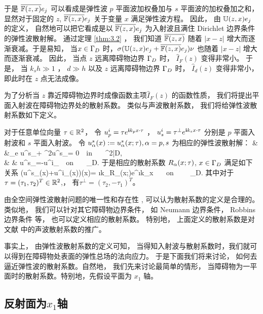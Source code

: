 {于是 $\overline{\mathbb{F}(z,x)}e_j$ 可以看成是弹性波 $p$ 平面波加权叠加与 $s$ 平面波的加权叠加之和， 显然对于固定的 $z$, $\overline{\mathbb{F}(z,x)}e_j$ 关于变量 $x$ 满足弹性波方程。 因此， 由 $\mathbb{U}(z,x)e_j$ 的定义， 自然地可以把它看成是以 $\overline{\mathbb{F}(z,x)}e_j$ 为入射波且满住 Dirichlet 边界条件的弹性波散射解。 通过定理 \ref{thm:3.2} ， 我们知道 $\overline{\mathbb{F}(z,x)}$ 随着 $|x-z|$ 增大而逐渐衰减。于是易知， 当$x\in \Gamma_D$ 时，$\sigma(\mathbb{U}(z,x)e_j+\overline{\mathbb{F}(z,x)}e_j)\nu$ 也随着 $|x-z|$ 增大而逐渐衰减。 因此， 当点 $z$ 远离障碍物边界 $\Gamma_D$ 时， $\hat{I}_F(z)$ 变得非常小。 于是， 当 $k_s h \gg 1$ ， $d\gg h$ 以及 $z$ 远离障碍物边界 $\Gamma_D$ 时， $\hat{I}_d(z)$ 变得非常小， 即此时在 $z$ 点无法成像。

为了分析当 $z$ 靠近障碍物边界时成像函数主项$\hat{I}_F(z)$ 的函数性质， 我们将提出平面入射波在障碍物边界处的散射系数。 类似与声波散射系数， 我们将给弹性波散射系数如下定义。

\begin{definition}\label{scarr_con}
	对于任意单位向量 $\tau\in \mathbb{R}^2$， 令 $u^i_p =\tau e^{\mathbf{i} k_p x\cdot \tau}$ ，  $u^i_s= \tau^\perp e^{\mathbf{i} k_s x\cdot \tau}$ 分别是 $p$ 平面入射波和 $s$ 平面入射波。   令 $u^s_\alpha (x) := u^s_\alpha(x;\tau), \alpha=p,s$ 为相应的弹性波散射解：
	\be\label{sc1}
	& &\De_e u^s_\alpha + \om^2u^s_\alpha = 0\ \ \mbox{in }   \ \ \R^2\bks\bar{D}, \ \ \ \  \\
	& & u^s_\alpha =-u^i_\alpha \ \ \mbox{on }  \ \ \Ga_D.
	\ee
	于是相应的散射系数 $R_\alpha(x;\tau)$, $x\in\Gamma_D$ 满足如下关系
	\ben
	\sigma(u^s_\alpha(x)+u^i_\alpha(x))\nu(x)= \i k_\alpha R_\alpha(x;\tau)e^{\i k_\alpha x\cdot \tau}  \ \ \ \mbox{on } \ \ \  \Ga_D.
	\een
	其中对于 $\tau=(\tau_1,\tau_2)^T\in\mathbb{R}^2$,， 有$\tau^\perp=(\tau_2,-\tau_1)^T$。
\end{definition}
\begin{remark}
	由全空间弹性波散射问题的唯一性和存在性 \cite{cxz2016,ku63}, 可以认为散射系数的定义是合理的。 类似地， 我们可以针对其它障碍物边界条件， 如 Neumann 边界条件， Robbins 边界条件 等， 也可以定义相应的散射系数。 特别地， 上面定义的散射系数是对文献\cite{RTMhalf_aco} 中的声波散射系数的推广。
\end{remark}

事实上， 由弹性波散射系数的定义可知， 当得知入射波与散射系数时，我们就可以得到在障碍物处表面的弹性总场的法向应力。 于是下面我们将来讨论， 如何去逼近弹性波的散射系数。自然地， 我们先来讨论最简单的情形， 当障碍物为一平面时的散射系数。特别地，先假设平面为 $x_1$ 轴。

\subsection{反射面为$x_1$轴}

}
